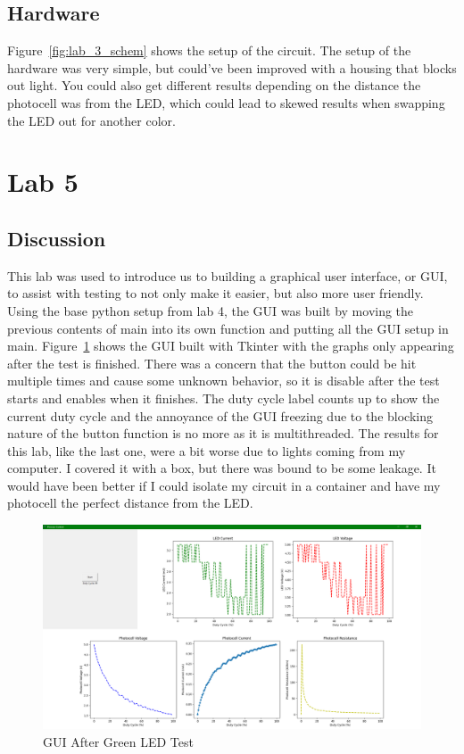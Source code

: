 \documentclass[12pt,titlepage]{article}
\begin{document}
\subsection{Hardware}
Figure~\ref{fig:lab_3_schem} shows the setup of the circuit. The setup of the hardware was very simple, but
could've been improved with a housing that blocks out light. You could also get different results depending
on the distance the photocell was from the LED, which could lead to skewed results when swapping the LED out
for another color.
\section{Lab 5}
\subsection{Discussion}
This lab was used to introduce us to building a graphical user interface, or GUI, to assist with testing to not only make it easier, but also more user friendly. Using the
base python setup from lab 4, the GUI was built by moving the previous contents of main into its own function and putting all the GUI setup in main.
Figure~\ref{fig:gui} shows the GUI built with Tkinter with the graphs only appearing after the test is finished.
There was a concern that the button could be hit multiple times and cause some unknown behavior, so it is disable after the test starts and enables when it finishes. The duty cycle
label counts up to show the current duty cycle and the annoyance of the GUI freezing due to the blocking nature of the button function is no more as it is multithreaded.
The results for this lab, like the last one, were a bit worse due to lights coming from my computer. I covered it with a box, but there was bound to be some leakage.
It would have been better if I could isolate my circuit in a container and have my photocell the perfect distance from the LED.
\begin{figure}[!htb]
  \centering
  \includegraphics[width=5in]{lab_5/gui.png}
  \caption{GUI After Green LED Test}\label{fig:gui}
\end{figure}
\end{document}
